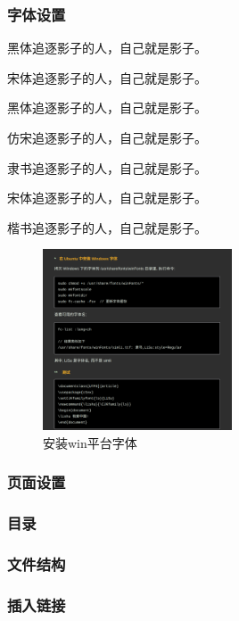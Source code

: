 \documentclass[11pt]{ctexart}
\newcommand{\lishu}{\CJKfamily{ls}}
\begin{document}
 \subsubsection{字体设置}
 
 {\heiti{} 黑体\qquad 追逐影子的人，自己就是影子。}
 
 {\songti{} 宋体\qquad 追逐影子的人，自己就是影子。}
 
    {\heiti{} 黑体\qquad 追逐影子的人，自己就是影子。}
 
 {\fangsong{} 仿宋\qquad 追逐影子的人，自己就是影子。}
 
 {\lishu{} 隶书\qquad 追逐影子的人，自己就是影子。}
 
  {\songti{} 宋体\qquad 追逐影子的人，自己就是影子。}
  
   {\kaishu{} 楷书\qquad 追逐影子的人，自己就是影子。}
   
   
   \begin{figure}[ht]
   	\centering
   	\includegraphics[width=0.5\textwidth]{images/font.png}
   	\caption{安装win平台字体}
   	\label{fig:setfont}
   \end{figure}
 \subsubsection{页面设置}
 
 \subsubsection{目录}
 
 \subsubsection{文件结构}
 
 \subsubsection{插入链接}
 
\end{document}
